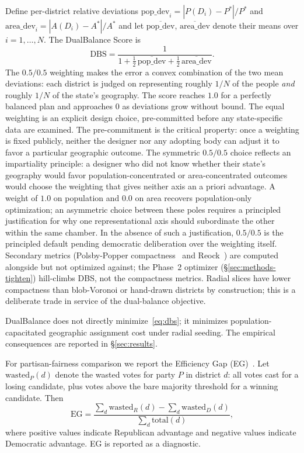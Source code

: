 Define per-district relative deviations
$\mathrm{pop\_dev}_i = |P(D_i) - P^*|/P^*$ and
$\mathrm{area\_dev}_i = |A(D_i) - A^*|/A^*$ and let
$\overline{\mathrm{pop\_dev}}$, $\overline{\mathrm{area\_dev}}$
denote their means over $i = 1, \ldots, N$. The DualBalance Score is
\begin{equation}
  \mathrm{DBS}
    = \frac{1}{1
       + \tfrac{1}{2}\,\overline{\mathrm{pop\_dev}}
       + \tfrac{1}{2}\,\overline{\mathrm{area\_dev}}}.
  \label{eq:dbs}
\end{equation}
The $0.5/0.5$ weighting makes the error a convex combination of the
two mean deviations: each district is judged on representing roughly
$1/N$ of the people \emph{and} roughly $1/N$ of the state's geography.
The score reaches $1.0$ for a perfectly balanced plan and approaches
$0$ as deviations grow without bound. The equal weighting is an explicit design choice, pre-committed
before any state-specific data are examined. The pre-commitment
is the critical property: once a weighting is fixed publicly,
neither the designer nor any adopting body can adjust it to favor
a particular geographic outcome. The symmetric $0.5/0.5$ choice reflects an impartiality principle:
a designer who did not know whether their state's geography would
favor population-concentrated or area-concentrated outcomes would
choose the weighting that gives neither axis an a priori advantage.
A weight of $1.0$ on population and $0.0$ on area recovers
population-only optimization; an asymmetric choice between these
poles requires a principled justification for why one representational
axis should subordinate the other within the same chamber. In the
absence of such a justification, $0.5/0.5$ is the principled default
pending democratic deliberation over the weighting itself. Secondary metrics (Polsby-Popper compactness~\cite{polsbypopper1991}
and Reock~\cite{reock1961}) are computed alongside but not optimized
against; the Phase~2 optimizer (\S\ref{sec:methods-tighten})
hill-climbs DBS, not the compactness metrics. Radial slices have
lower compactness than blob-Voronoi or hand-drawn districts by
construction; this is a deliberate trade in service of the
dual-balance objective.

DualBalance does not directly minimize~\eqref{eq:dbs}; it minimizes
population-capacitated geographic assignment cost under radial
seeding. The empirical consequences are reported in
\S\ref{sec:results}.

For partisan-fairness comparison we report the Efficiency Gap
(EG)~\cite{stephanopoulosmcghee2015}. Let $\mathrm{wasted}_P(d)$
denote the wasted votes for party $P$ in district $d$: all votes
cast for a losing candidate, plus votes above the bare majority
threshold for a winning candidate. Then
\begin{equation}
  \mathrm{EG}
    = \frac{\sum_d \mathrm{wasted}_R(d) - \sum_d \mathrm{wasted}_D(d)}
           {\sum_d \mathrm{total}(d)},
  \label{eq:eg}
\end{equation}
where positive values indicate Republican advantage and negative
values indicate Democratic advantage. EG is reported as a diagnostic.

